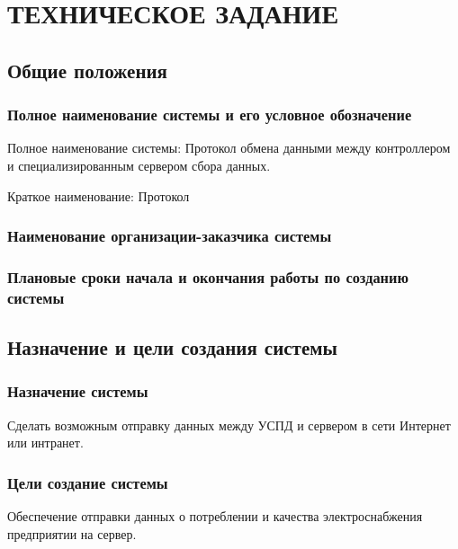 \chapter{ТЕХНИЧЕСКОЕ ЗАДАНИЕ}

\section{Общие положения}

\subsection{Полное наименование системы и его условное обозначение}

Полное наименование системы: Протокол обмена данными между контроллером и специализированным сервером сбора данных.

Краткое наименование: Протокол

\subsection{Наименование организации-заказчика системы}

\begin{flushleft}
\end{flushleft}

\subsection{Плановые сроки начала и окончания работы по созданию системы}

\begin{flushleft}
\end{flushleft}

\section{Назначение и цели создания системы}

\subsection{Назначение системы}

Сделать возможным отправку данных между УСПД и сервером в сети Интернет или интранет.

\subsection{Цели создание системы}

Обеспечение отправки данных о потреблении и качества электроснабжения предприятии на сервер.


